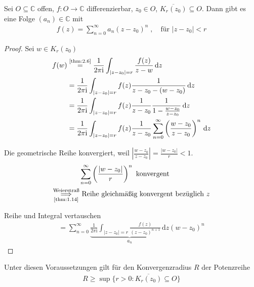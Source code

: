 \begin{theorem}[Potenzreihenentwicklungssatz] \label{thm:2.7}
  Sei $O \subseteq \mathbb{C}$ offen, $f : O \to \mathbb{C}$ differenzierbar, $z_0 \in O$, $\overline{K_r(z_0)} \subseteq O$. Dann gibt es eine Folge $(a_n) \in \mathbb{C}$ mit
  \begin{align*}
    f(z) = \sum\limits_{n=0}^{\infty} a_n (z-z_0)^n \; , \quad \text{für } |z-z_0| < r
  \end{align*}
  
  \begin{proof}
    Sei $w \in K_r(z_0)$
    \begin{align*}
      f(w) &\overset{\text{\ref{thm:2.6}}}{=} \frac{1}{2 \pi \mathrm{i}} \int_{|z-z_0| = r} \frac{f(z)}{z-w} \, \mathrm{d}z \\
      &= \frac{1}{2 \pi \mathrm{i}} \int_{|z-z_0| = r} f(z) \frac{1}{z-z_0-(w-z_0)} \, \mathrm{d}z \\
      &= \frac{1}{2 \pi \mathrm{i}} \int_{|z-z_0| = r} f(z) \frac{1}{z-z_0} \frac{1}{1-\frac{w-z_0}{z-z_0}} \, \mathrm{d}z \\
      &= \frac{1}{2 \pi \mathrm{i}} \int_{|z-z_0| = r} f(z) \frac{1}{z-z_0} \sum\limits_{n=0}^{\infty} \left( \frac{w-z_0}{z-z_0} \right)^n \, \mathrm{d}z
    \end{align*}
    \begin{notice*}
      Die geometrische Reihe konvergiert, weil $\left| \frac{w-z_0}{z-z_0} \right| = \frac{|w-z_0|}{r} < 1$.
      \begin{align*}
        &\sum\limits_{n=0}^{\infty} \left(\frac{|w-z_0|}{r}\right)^n \text{ konvergent } \\
        \overset{\text{Weierstraß}}{\underset{\text{\ref{thm:1.14}}}{\implies}}
        &\text{ Reihe gleichmäßig konvergent bezüglich $z$}
      \end{align*}
    \end{notice*}
    Reihe und Integral vertauschen
    \begin{align*}
      = \sum\limits_{n=0}^{\infty} \underbrace{\frac{1}{2 \pi \mathrm{i}} \int_{|z-z_0| = r} \frac{f(z)}{(z-z_0)^{n+1}} \, \mathrm{d}z}_{a_n} \left( w-z_0 \right)^n
    \end{align*}
  \end{proof}
\end{theorem}

\begin{notice}[Folgerung]
  Unter diesen Voraussetzungen gilt für den Konvergenzradius $R$ der Potenzreihe
  \begin{align*}
    R \geq \sup \{ r > 0 : \overline{K_r(z_0)} \subseteq O \}
  \end{align*}
\end{notice}

